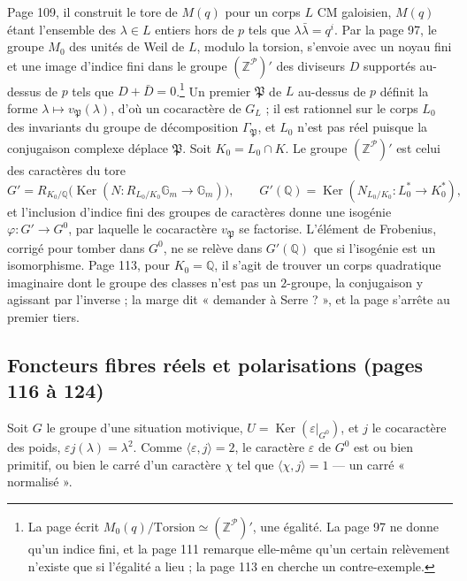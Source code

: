 \documentclass[11pt,a4paper]{article}
\begin{document}
Page 109, il construit le tore de $M(q)$ pour un corps $L$ CM galoisien,
$M(q)$ étant l'ensemble des $\lambda \in L$ entiers hors de $p$ tels que
$\lambda\bar{\lambda} = q^{i}$. Par la page 97, le groupe $M_{0}$ des unités de
Weil de $L$, modulo la torsion, s'envoie avec un noyau fini et une image d'indice
fini dans le groupe $(\mathbb{Z}^{\mathcal{P}})'$ des diviseurs $D$ supportés
au-dessus de $p$ tels que $D + \bar{D} = 0$.\footnote{La page écrit
$M_{0}(q)/\mathrm{Torsion} \simeq (\mathbb{Z}^{\mathcal{P}})'$, une égalité. La
page 97 ne donne qu'un indice fini, et la page 111 remarque elle-même qu'un
certain relèvement n'existe que si l'égalité a lieu ; la page 113 en cherche un
contre-exemple.} Un premier $\mathfrak{P}$ de $L$ au-dessus de $p$ définit la
forme $\lambda \mapsto v_{\mathfrak{P}}(\lambda)$, d'où un cocaractère de
$G_{L}$ ; il est rationnel sur le corps $L_{0}$ des invariants du groupe de
décomposition $\Gamma_{\mathfrak{P}}$, et $L_{0}$ n'est pas réel puisque la
conjugaison complexe déplace $\mathfrak{P}$. Soit $K_{0} = L_{0} \cap K$. Le
groupe $(\mathbb{Z}^{\mathcal{P}})'$ est celui des caractères du tore
\[
  G' = R_{K_{0}/\mathbb{Q}}\bigl( \operatorname{Ker}(N \colon
  R_{L_{0}/K_{0}}\mathbb{G}_{m} \to \mathbb{G}_{m}) \bigr), \qquad
  G'(\mathbb{Q}) = \operatorname{Ker}(N_{L_{0}/K_{0}} \colon L_{0}^{*} \to
  K_{0}^{*}) ,
\]
et l'inclusion d'indice fini des groupes de caractères donne une isogénie
$\varphi \colon G' \to G^{0}$, par laquelle le cocaractère $v_{\mathfrak{P}}$ se
factorise. L'élément de Frobenius, corrigé pour tomber dans $G^{0}$, ne se relève
dans $G'(\mathbb{Q})$ que si l'isogénie est un isomorphisme. Page 113, pour
$K_{0} = \mathbb{Q}$, il s'agit de trouver un corps quadratique imaginaire dont
le groupe des classes n'est pas un $2$-groupe, la conjugaison y agissant par
l'inverse ; la marge dit « demander à Serre ? », et la page s'arrête au premier
tiers.

\subsection*{Foncteurs fibres réels et polarisations (pages 116 à 124)}

Soit $G$ le groupe d'une situation motivique, $U = \operatorname{Ker}(\varepsilon
|_{G^{0}})$, et $j$ le cocaractère des poids, $\varepsilon j(\lambda) =
\lambda^{2}$. Comme $\langle \varepsilon, j \rangle = 2$, le caractère
$\varepsilon$ de $G^{0}$ est ou bien primitif, ou bien le carré d'un caractère
$\chi$ tel que $\langle \chi, j \rangle = 1$ --- un carré « normalisé ».
\end{document}
